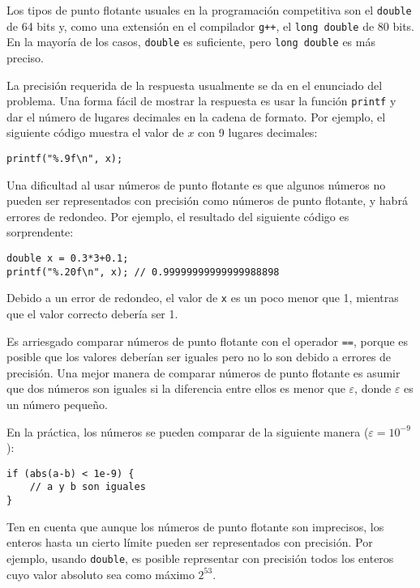 Los tipos de punto flotante usuales en
la programaci\'on competitiva son
el \texttt{double} de 64 bits
y, como una extensi\'on en el compilador \texttt{g++},
el \texttt{long double} de 80 bits.
En la mayor\'ia de los casos, \texttt{double} es suficiente,
pero \texttt{long double} es m\'as preciso.

La precisi\'on requerida de la respuesta
usualmente se da en el enunciado del problema.
Una forma f\'acil de mostrar la respuesta es usar
la funci\'on \texttt{printf}
y dar el n\'umero de lugares decimales
en la cadena de formato.
Por ejemplo, el siguiente c\'odigo muestra
el valor de $x$ con 9 lugares decimales:

\begin{lstlisting}
printf("%.9f\n", x);
\end{lstlisting}

Una dificultad al usar n\'umeros de punto flotante
es que algunos n\'umeros no pueden ser representados
con precisi\'on como n\'umeros de punto flotante,
y habr\'a errores de redondeo.
Por ejemplo, el resultado del siguiente c\'odigo
es sorprendente:

\begin{lstlisting}
double x = 0.3*3+0.1;
printf("%.20f\n", x); // 0.99999999999999988898
\end{lstlisting}

Debido a un error de redondeo,
el valor de \texttt{x} es un poco menor que 1,
mientras que el valor correcto deber\'ia ser 1.

Es arriesgado comparar n\'umeros de punto flotante
con el operador \texttt{==},
porque es posible que los valores deber\'ian ser
iguales pero no lo son debido a errores de precisi\'on.
Una mejor manera de comparar n\'umeros de punto flotante
es asumir que dos n\'umeros son iguales
si la diferencia entre ellos es menor que $\varepsilon$,
donde $\varepsilon$ es un n\'umero peque\~no.

En la pr\'actica, los n\'umeros se pueden comparar
de la siguiente manera ($\varepsilon=10^{-9}$):

\begin{lstlisting}
if (abs(a-b) < 1e-9) {
    // a y b son iguales
}
\end{lstlisting}

Ten en cuenta que aunque los n\'umeros de punto flotante son imprecisos,
los enteros hasta un cierto l\'imite pueden ser
representados con precisi\'on.
Por ejemplo, usando \texttt{double},
es posible representar con precisi\'on todos los
enteros cuyo valor absoluto sea como m\'aximo $2^{53}$.

